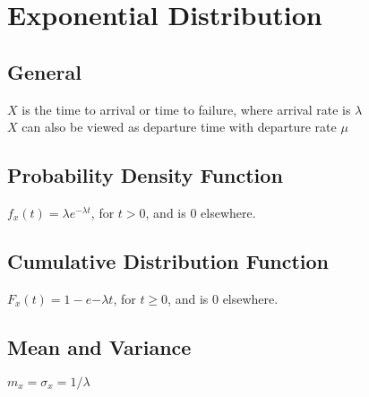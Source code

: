 \section*{Exponential Distribution}

\subsection*{General}
$X$ is the time to arrival or time to failure, where arrival rate is $\lambda$ \\
$X$ can also be viewed as departure time with departure rate $\mu$

\subsection*{Probability Density Function}
$f_x(t) = \lambda e^{-\lambda t}$, for $t>0$, and is $0$ elsewhere.

\subsection*{Cumulative Distribution Function}
$F_x(t) = 1-e{-\lambda t}$, for $t\geq0$, and is $0$ elsewhere.

\subsection*{Mean and Variance}
$m_x=\sigma_x=1/\lambda$
    

